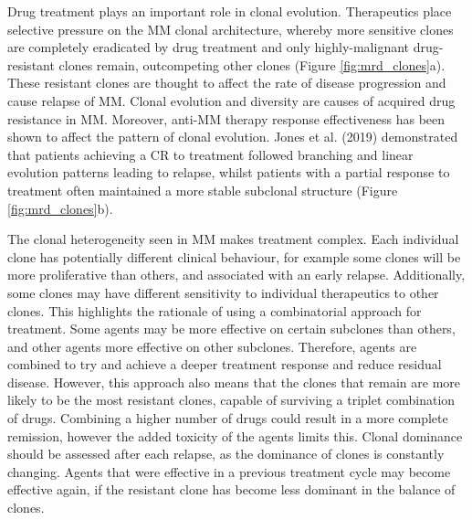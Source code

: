 Drug treatment plays an important role in clonal evolution.
Therapeutics place selective pressure on the MM clonal architecture, whereby more sensitive clones are completely eradicated by drug treatment and only highly-malignant drug-resistant clones remain, outcompeting other clones\cite{furukawa2020molecular} (Figure \ref{fig:mrd_clones}a).
These resistant clones are thought to affect the rate of disease progression and cause relapse of MM\@.
Clonal evolution and diversity are causes of acquired drug resistance in MM\@.
Moreover, anti-MM therapy response effectiveness has been shown to affect the pattern of clonal evolution.
Jones et al. (2019) demonstrated that patients achieving a CR to treatment followed branching and linear evolution patterns leading to relapse, whilst patients with a partial response to treatment often maintained a more stable subclonal structure\cite{jones2019clonal} (Figure \ref{fig:mrd_clones}b).

The clonal heterogeneity seen in MM makes treatment complex.
Each individual clone has potentially different clinical behaviour, for example some clones will be more proliferative than others, and associated with an early relapse.
Additionally, some clones may have different sensitivity to individual therapeutics to other clones.
This highlights the rationale of using a combinatorial approach for treatment.
Some agents may be more effective on certain subclones than others, and other agents more effective on other subclones.
Therefore, agents are combined to try and achieve a deeper treatment response and reduce residual disease.
However, this approach also means that the clones that remain are more likely to be the most resistant clones, capable of surviving a triplet combination of drugs.
Combining a higher number of drugs could result in a more complete remission, however the added toxicity of the agents limits this.
Clonal dominance should be assessed after each relapse, as the dominance of clones is constantly changing.
Agents that were effective in a previous treatment cycle may become effective again, if the resistant clone has become less dominant in the balance of clones\cite{brioli2014impact}.


